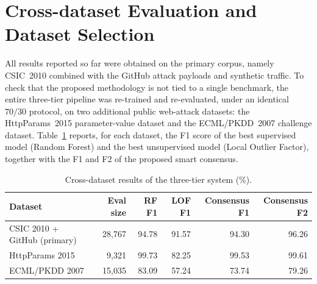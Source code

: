 \documentclass[../main.tex]{subfiles}
\begin{document}
\section{Cross-dataset Evaluation and Dataset Selection}
\label{sec:res-crossdataset}

All results reported so far were obtained on the primary corpus, namely
CSIC~2010 combined with the GitHub attack payloads and synthetic traffic. To
check that the proposed methodology is not tied to a single benchmark, the
entire three-tier pipeline was re-trained and re-evaluated, under an
identical $70/30$ protocol, on two additional public web-attack datasets:
the HttpParams~2015 parameter-value dataset and the ECML/PKDD~2007 challenge
dataset. Table~\ref{tab:crossdataset} reports, for each dataset, the F1 score
of the best supervised model (Random Forest) and the best unsupervised model
(Local Outlier Factor), together with the F1 and F2 of the proposed smart
consensus.

\begin{table}[H]
  \centering
  \caption{Cross-dataset results of the three-tier system (\%).}
  \label{tab:crossdataset}
  \renewcommand{\arraystretch}{1.35}
  \setlength{\tabcolsep}{8pt}
  \footnotesize
  \begin{tabular}{|l|r|r|r|r|r|}
    \hline
    \textbf{Dataset} & \textbf{Eval size} & \textbf{RF F1} &
    \textbf{LOF F1} & \textbf{Consensus F1} & \textbf{Consensus F2} \\
    \hline
    CSIC 2010 + GitHub (primary) & 28{,}767 & 94.78 & 91.57 & 94.30 & 96.26 \\
    \hline
    HttpParams 2015 & 9{,}321 & 99.73 & 82.25 & 99.53 & 99.61 \\
    \hline
    ECML/PKDD 2007 & 15{,}035 & 83.09 & 57.24 & 73.74 & 79.26 \\
    \hline
  \end{tabular}
\end{table}
\end{document}
